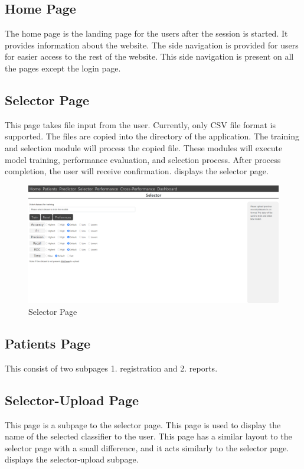 \subsection{Home Page} \label{subsec:home_page}
The home page is the landing page for the users after the session is started. It provides information about the website. The side navigation is provided for users for easier access to the rest of the website. This side navigation is present on all the pages except the login page.

\subsection{Selector Page} \label{subsec:selector_page}
This page takes file input from the user. Currently, only CSV file format is supported. The files are copied into the directory of the application. The training and selection module will process the copied file. These modules will execute model training, performance evaluation, and selection process. After process completion, the user will receive confirmation.  displays the selector page.

\begin{figure}[H]
  \centering
  \includegraphics[width=0.7\columnwidth]{media/website/pages/selector.png}
  \caption{Selector Page}
  \label{fig:web_selector_page}
\end{figure}

\subsection{Patients Page}\label{subsec:patients_page}
This consist of two subpages 1. registration and 2. reports.

\subsection{Selector-Upload Page} \label{subsec:selector_upload_page}
This page is a subpage to the selector page. This page is used to display the name of the selected classifier to the user. This page has a similar layout to the selector page with a small difference, and it acts similarly to the selector page.  displays the selector-upload subpage.

